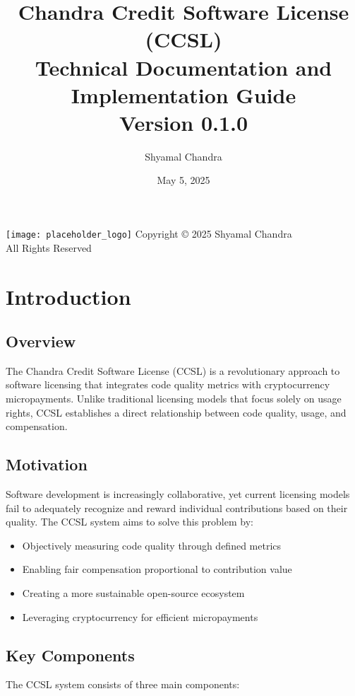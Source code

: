 \documentclass[11pt,a4paper]{report}
\title{
    \vspace{2cm}
    \Huge{Chandra Credit Software License (CCSL)} \\
    \vspace{0.5cm}
    \Large{Technical Documentation and Implementation Guide} \\
    \vspace{0.5cm}
    \large{Version 0.1.0} \\
    \vspace{2cm}
}
\author{Shyamal Chandra}
\date{May 5, 2025}
\begin{document}
\begin{titlepage}
    \maketitle
    \begin{center}
        \vfill
        \texttt{[image: placeholder\_logo]}
        \vfill
        \large{Copyright \copyright{} 2025 Shyamal Chandra} \\
        \large{All Rights Reserved}
    \end{center}
\end{titlepage}

\tableofcontents
\newpage

\chapter{Introduction}

\section{Overview}
The Chandra Credit Software License (CCSL) is a revolutionary approach to software licensing that integrates code quality metrics with cryptocurrency micropayments. Unlike traditional licensing models that focus solely on usage rights, CCSL establishes a direct relationship between code quality, usage, and compensation.

\section{Motivation}
Software development is increasingly collaborative, yet current licensing models fail to adequately recognize and reward individual contributions based on their quality. The CCSL system aims to solve this problem by:

\begin{itemize}
    \item Objectively measuring code quality through defined metrics
    \item Enabling fair compensation proportional to contribution value
    \item Creating a more sustainable open-source ecosystem
    \item Leveraging cryptocurrency for efficient micropayments
\end{itemize}

\section{Key Components}
The CCSL system consists of three main components:
\end{document}
